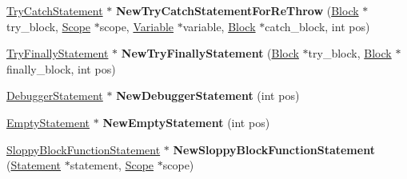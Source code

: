 \begin{DoxyCompactItemize}
\item 
\hyperlink{classv8_1_1internal_1_1_try_catch_statement}{Try\+Catch\+Statement} $\ast$ {\bfseries New\+Try\+Catch\+Statement\+For\+Re\+Throw} (\hyperlink{classv8_1_1internal_1_1_block}{Block} $\ast$try\+\_\+block, \hyperlink{classv8_1_1internal_1_1_scope}{Scope} $\ast$scope, \hyperlink{classv8_1_1internal_1_1_variable}{Variable} $\ast$variable, \hyperlink{classv8_1_1internal_1_1_block}{Block} $\ast$catch\+\_\+block, int pos)\hypertarget{classv8_1_1internal_1_1_b_a_s_e___e_m_b_e_d_d_e_d_a19e9729effbb9b5f4df06b0269bd2a96}{}\label{classv8_1_1internal_1_1_b_a_s_e___e_m_b_e_d_d_e_d_a19e9729effbb9b5f4df06b0269bd2a96}

\item 
\hyperlink{classv8_1_1internal_1_1_try_finally_statement}{Try\+Finally\+Statement} $\ast$ {\bfseries New\+Try\+Finally\+Statement} (\hyperlink{classv8_1_1internal_1_1_block}{Block} $\ast$try\+\_\+block, \hyperlink{classv8_1_1internal_1_1_block}{Block} $\ast$finally\+\_\+block, int pos)\hypertarget{classv8_1_1internal_1_1_b_a_s_e___e_m_b_e_d_d_e_d_a8bb51a308c80e1d0cb86003496c45458}{}\label{classv8_1_1internal_1_1_b_a_s_e___e_m_b_e_d_d_e_d_a8bb51a308c80e1d0cb86003496c45458}

\item 
\hyperlink{classv8_1_1internal_1_1_debugger_statement}{Debugger\+Statement} $\ast$ {\bfseries New\+Debugger\+Statement} (int pos)\hypertarget{classv8_1_1internal_1_1_b_a_s_e___e_m_b_e_d_d_e_d_a6a4a66697cb92a36f8f923117545408e}{}\label{classv8_1_1internal_1_1_b_a_s_e___e_m_b_e_d_d_e_d_a6a4a66697cb92a36f8f923117545408e}

\item 
\hyperlink{classv8_1_1internal_1_1_empty_statement}{Empty\+Statement} $\ast$ {\bfseries New\+Empty\+Statement} (int pos)\hypertarget{classv8_1_1internal_1_1_b_a_s_e___e_m_b_e_d_d_e_d_adc4f43753fb40b1cfa09aae7a052cde4}{}\label{classv8_1_1internal_1_1_b_a_s_e___e_m_b_e_d_d_e_d_adc4f43753fb40b1cfa09aae7a052cde4}

\item 
\hyperlink{classv8_1_1internal_1_1_sloppy_block_function_statement}{Sloppy\+Block\+Function\+Statement} $\ast$ {\bfseries New\+Sloppy\+Block\+Function\+Statement} (\hyperlink{classv8_1_1internal_1_1_statement}{Statement} $\ast$statement, \hyperlink{classv8_1_1internal_1_1_scope}{Scope} $\ast$scope)\hypertarget{classv8_1_1internal_1_1_b_a_s_e___e_m_b_e_d_d_e_d_a711ac1beae27bd4a5b4e2ce76bbba444}{}\label{classv8_1_1internal_1_1_b_a_s_e___e_m_b_e_d_d_e_d_a711ac1beae27bd4a5b4e2ce76bbba444}


\end{DoxyCompactItemize}
